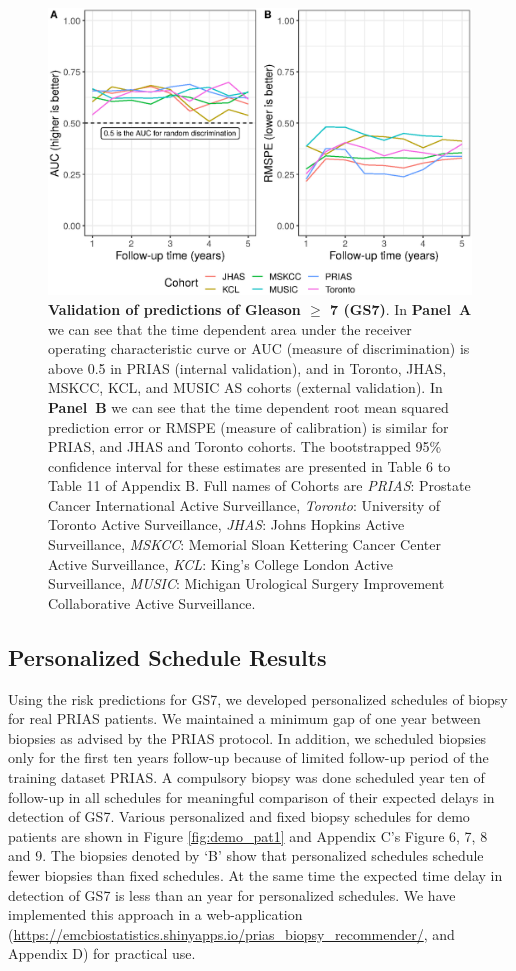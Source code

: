 \begin{figure}
\centerline{\includegraphics[width=\columnwidth]{images/auc_pe.eps}}
\caption{\textbf{Validation of predictions of Gleason $\geq$ 7 (GS7)}. In \textbf{Panel~A} we can see that the time dependent area under the receiver operating characteristic curve or AUC (measure of discrimination) is above 0.5 in PRIAS (internal validation), and in Toronto, JHAS, MSKCC, KCL, and MUSIC AS cohorts (external validation). In \textbf{Panel~B} we can see that the time dependent root mean squared prediction error or RMSPE (measure of calibration) is similar for PRIAS, and JHAS and Toronto cohorts. The bootstrapped 95\% confidence interval for these estimates are presented in Table 6 to Table 11 of Appendix B. Full names of Cohorts are \textit{PRIAS}: Prostate Cancer International Active Surveillance, \textit{Toronto}: University of Toronto Active Surveillance, \textit{JHAS}: Johns Hopkins Active Surveillance, \textit{MSKCC}: Memorial Sloan Kettering Cancer Center Active Surveillance, \textit{KCL}: King's College London Active Surveillance, \textit{MUSIC}: Michigan Urological Surgery Improvement Collaborative Active Surveillance.}
\label{fig:auc_pe}
\end{figure}

\subsection{Personalized Schedule Results}
Using the risk predictions for GS7, we developed personalized schedules of biopsy for real PRIAS patients. We maintained a minimum gap of one year between biopsies as advised by the PRIAS protocol. In addition, we scheduled biopsies only for the first ten years follow-up because of limited follow-up period of the training dataset PRIAS. A compulsory biopsy was done scheduled year ten of follow-up in all schedules for meaningful comparison of their expected delays in detection of GS7. Various personalized and fixed biopsy schedules for demo patients are shown in Figure \ref{fig:demo_pat1} and Appendix C's Figure 6, 7, 8 and 9. The biopsies denoted by `B' show that personalized schedules schedule fewer biopsies than fixed schedules. At the same time the expected time delay in detection of GS7 is less than an year for personalized schedules. We have implemented this approach in a web-application (\url{https://emcbiostatistics.shinyapps.io/prias_biopsy_recommender/}, and Appendix D) for practical use.